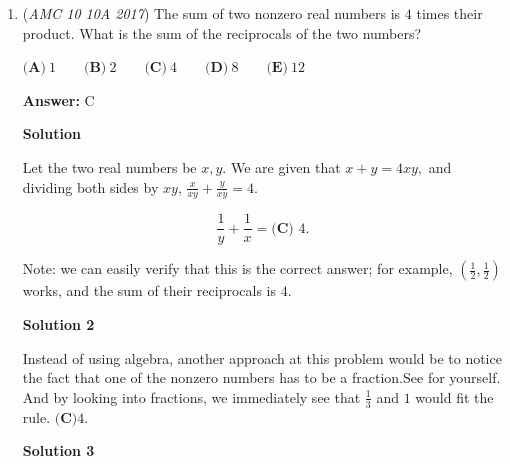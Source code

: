 \begin{enumerate}
 $\textbf{(A)}\ 13.5\qquad\textbf{(B)}\ 14\qquad\textbf{(C)}\ 14.5\qquad\textbf{(D)}\ 15\qquad\textbf{(E)}\ 15.5$

 \textbf{Answer: }B



\textbf{Solution}

Every $30$ seconds, $3$ toys are put in the box and $2$ toys are taken out, so the number of toys in the box increases by $3-2=1$ every $30$ seconds. Then after $27 \times 30 = 810$ seconds (or $13 \frac{1}{2}$ minutes), there are $27$ toys in the box. Mia's mom will then put the remaining $3$ toys into the box after $30$ more seconds, so the total time taken is $27\times 30+30=840$ seconds, or $\boxed{(\textbf{B})\ 14}$ minutes.

 Note: During the last time Mia's mom will complete picking up the $30$ toys (before Mia can take $2$ out) which is the reason that you calculate up to $27$ and then the rest.

 


	\item (\textit{AMC 10 10A 2017}) The sum of two nonzero real numbers is $4$ times their product. What is the sum of the reciprocals of the two numbers?


 $\textbf{(A)}\ 1\qquad\textbf{(B)}\ 2\qquad\textbf{(C)}\ 4\qquad\textbf{(D)}\ 8\qquad\textbf{(E)}\ 12$

 \textbf{Answer: }C



\textbf{Solution}

Let the two real numbers be $x,y$. We are given that $x+y=4xy,$ and dividing both sides by $xy$, $\frac{x}{xy}+\frac{y}{xy}=4.$

 \[\frac{1}{y}+\frac{1}{x}=\boxed{\textbf{(C) } 4}.\]

 Note: we can easily verify that this is the correct answer; for example, $\left(\frac{1}{2}, \frac{1}{2}\right)$ works, and the sum of their reciprocals is $4$.

 



\textbf{Solution 2}

Instead of using algebra, another approach at this problem would be to notice the fact that one of the nonzero numbers has to be a fraction.See for yourself. And by looking into fractions, we immediately see that $\frac{1}{3}$ and $1$ would fit the rule. $\boxed{\textbf{(C)} 4}.$




\textbf{Solution 3}


\end{enumerate}
